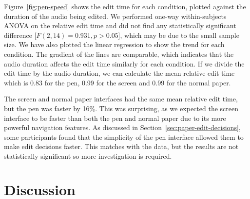 Figure~\ref{fig:pen-speed} shows the edit time for each condition, plotted against the duration of the audio being
edited.
We performed one-way within-subjects ANOVA on the relative edit time and did not find any statistically significant
difference [$F(2,14) = 0.931, p > 0.05$], which may be due to the small sample size.  We have also plotted the linear
regression to show the trend for each condition. The gradient of the lines are comparable, which indicates that the
audio duration affects the edit time similarly for each condition.  If we divide the edit time by the audio duration,
we can calculate the mean relative edit time which is 0.83 for the pen, 0.99 for the screen and 0.99 for the normal
paper.


The screen and normal paper interfaces had the same mean relative edit time, but the pen was faster by 16\%.  This was
surprising, as we expected the screen interface to be faster than both the pen and normal paper due to its more
powerful navigation features. As discussed in Section~\ref{sec:paper-edit-decisions}, some participants found that the
simplicity of the pen interface allowed them to make edit decisions faster. This matches with the data, but the results
are not statistically significant so more investigation is required.

\section{Discussion}\label{sec:paper-discussion}




